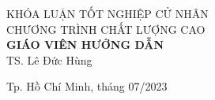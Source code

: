 \begin{titlepage}
\begin{center}
\large KHÓA LUẬN TỐT NGHIỆP CỬ NHÂN\\
\large CHƯƠNG TRÌNH CHẤT LƯỢNG CAO\\[2cm]

\textbf{GIÁO VIÊN HƯỚNG DẪN}\\
TS. Lê Đức Hùng


\vfill
Tp. Hồ Chí Minh, tháng 07/2023

\end{center}

\end{titlepage}